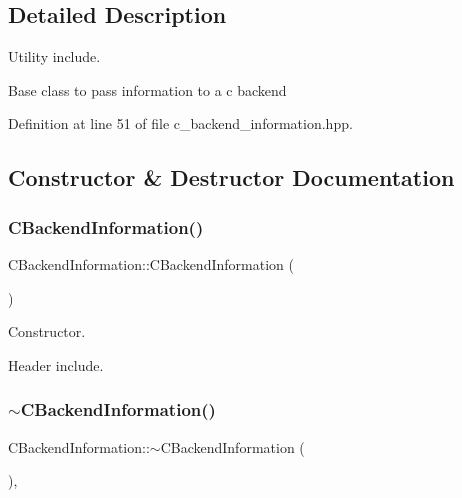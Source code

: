 \subsection{Detailed Description}
Utility include. 

Base class to pass information to a c backend 

Definition at line 51 of file c\+\_\+backend\+\_\+information.\+hpp.



\subsection{Constructor \& Destructor Documentation}
\mbox{\label{classCBackendInformation_a532a1da62672f9e1e7a23dc9da34a661}} 
\subsubsection{\texorpdfstring{C\+Backend\+Information()}{CBackendInformation()}}
{\footnotesize\ttfamily C\+Backend\+Information\+::\+C\+Backend\+Information (\begin{DoxyParamCaption}{ }\end{DoxyParamCaption})\hspace{0.3cm}{\ttfamily [default]}}



Constructor. 

Header include. \mbox{\label{classCBackendInformation_a6f4f9df9f833ad52da39958096bd8e39}} 
\subsubsection{\texorpdfstring{$\sim$\+C\+Backend\+Information()}{~CBackendInformation()}}
{\footnotesize\ttfamily C\+Backend\+Information\+::$\sim$\+C\+Backend\+Information (\begin{DoxyParamCaption}{ }\end{DoxyParamCaption})\hspace{0.3cm}{\ttfamily [virtual]}, {\ttfamily [default]}}



